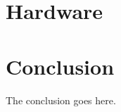\documentclass[journal,onecolumn]{IEEEtran}
\begin{document}
\section{Hardware} \label{sec:hardware}








\section{Conclusion}
The conclusion goes here.






\end{document}
